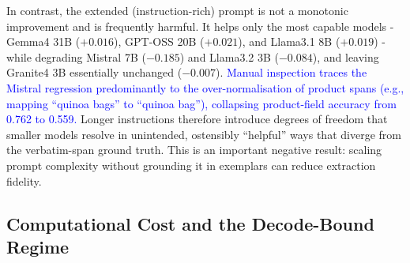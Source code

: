 \documentclass[journal,article,submit,pdftex,moreauthors]{Definitions/mdpi}
\begin{document}
In contrast, the extended (instruction-rich) prompt is not a monotonic improvement and is frequently harmful. It helps only the most capable models - Gemma4 31B ($+0.016$), GPT-OSS 20B ($+0.021$), and Llama3.1 8B ($+0.019$) - while degrading Mistral 7B ($-0.185$) and Llama3.2 3B ($-0.084$), and leaving Granite4 3B essentially unchanged ($-0.007$). \textcolor{blue}{Manual inspection traces the Mistral regression predominantly to the over-normalisation of product spans (e.g., mapping ``quinoa bags'' to ``quinoa bag''), collapsing product-field accuracy from 0.762 to 0.559.} Longer instructions therefore introduce degrees of freedom that smaller models resolve in unintended, ostensibly ``helpful'' ways that diverge from the verbatim-span ground truth. This is an important negative result: scaling prompt complexity without grounding it in exemplars can reduce extraction fidelity.

\subsection{Computational Cost and the Decode-Bound Regime}
\end{document}
